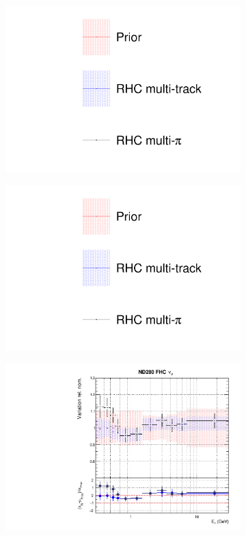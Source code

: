 \begin{figure}[t]
\centering
\begin{subfigure}{0.3\textwidth}
  \centering
  \includegraphics[width=1.0\linewidth, trim={5mm  130mm 0mm 10mm}, clip]{figs/rhcmpdat248_leg}	
\end{subfigure}
\begin{subfigure}{0.3\textwidth}
  \centering
  \includegraphics[width=1.0\linewidth, trim={5mm  0mm 0mm 70mm}, clip]{figs/rhcmpdat248_leg}	
\end{subfigure}
\begin{subfigure}{0.42\textwidth}
  \centering
  \includegraphics[width=0.75\linewidth]{figs/rhcmpdat28flux_0}

\end{subfigure}
\end{figure}
